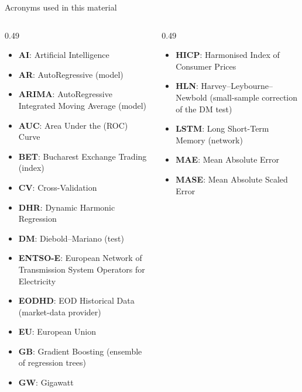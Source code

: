 {
\begin{frame}[noframenumbering]
    \titlepage
\end{frame}
}
\begin{frame}{Acronyms used in this material}
\begin{columns}[T]
\begin{column}{0.49\textwidth}
\begin{itemize}\setlength{\itemsep}{0pt}
    \item \textbf{AI}: Artificial Intelligence
    \item \textbf{AR}: AutoRegressive (model)
    \item \textbf{ARIMA}: AutoRegressive Integrated Moving Average (model)
    \item \textbf{AUC}: Area Under the (ROC) Curve
    \item \textbf{BET}: Bucharest Exchange Trading (index)
    \item \textbf{CV}: Cross-Validation
    \item \textbf{DHR}: Dynamic Harmonic Regression
    \item \textbf{DM}: Diebold–Mariano (test)
    \item \textbf{ENTSO-E}: European Network of Transmission System Operators for Electricity
    \item \textbf{EODHD}: EOD Historical Data (market-data provider)
    \item \textbf{EU}: European Union
    \item \textbf{GB}: Gradient Boosting (ensemble of regression trees)
    \item \textbf{GW}: Gigawatt
\end{itemize}
\end{column}
\begin{column}{0.49\textwidth}
\begin{itemize}\setlength{\itemsep}{0pt}
    \item \textbf{HICP}: Harmonised Index of Consumer Prices
    \item \textbf{HLN}: Harvey–Leybourne–Newbold (small-sample correction of the DM test)
    \item \textbf{LSTM}: Long Short-Term Memory (network)
    \item \textbf{MAE}: Mean Absolute Error
    \item \textbf{MASE}: Mean Absolute Scaled Error

\end{itemize}
\end{column}
\end{columns}
\end{frame}
